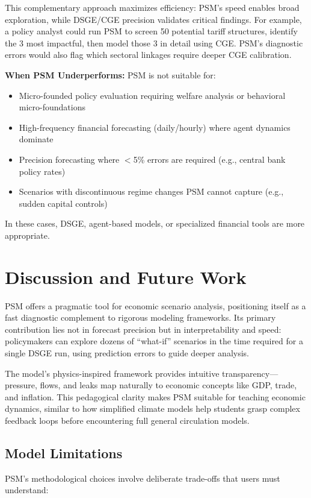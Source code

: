 \documentclass[11pt]{article}
\begin{document}
This complementary approach maximizes efficiency: PSM's speed enables broad exploration, while DSGE/CGE precision validates critical findings. For example, a policy analyst could run PSM to screen 50 potential tariff structures, identify the 3 most impactful, then model those 3 in detail using CGE. PSM's diagnostic errors would also flag which sectoral linkages require deeper CGE calibration.

\textbf{When PSM Underperforms:}
PSM is not suitable for:
\begin{itemize}
\item Micro-founded policy evaluation requiring welfare analysis or behavioral micro-foundations
\item High-frequency financial forecasting (daily/hourly) where agent dynamics dominate
\item Precision forecasting where $<$5\% errors are required (e.g., central bank policy rates)
\item Scenarios with discontinuous regime changes PSM cannot capture (e.g., sudden capital controls)
\end{itemize}

In these cases, DSGE, agent-based models, or specialized financial tools are more appropriate.

\section{Discussion and Future Work}
PSM offers a pragmatic tool for economic scenario analysis, positioning itself as a fast diagnostic complement to rigorous modeling frameworks. Its primary contribution lies not in forecast precision but in interpretability and speed: policymakers can explore dozens of ``what-if'' scenarios in the time required for a single DSGE run, using prediction errors to guide deeper analysis.

The model's physics-inspired framework provides intuitive transparency---pressure, flows, and leaks map naturally to economic concepts like GDP, trade, and inflation. This pedagogical clarity makes PSM suitable for teaching economic dynamics, similar to how simplified climate models help students grasp complex feedback loops before encountering full general circulation models.

\subsection{Model Limitations}
PSM's methodological choices involve deliberate trade-offs that users must understand:
\end{document}
